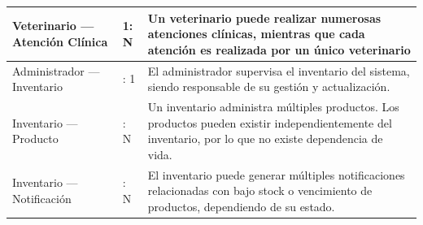 \documentclass[
]{article}
\newcounter{none} %
\begin{document}
{\def\LTcaptype{none} %
\begin{longtable}[]{@{}
  >{\raggedright\arraybackslash}p{}
  >{\raggedright\arraybackslash}p{}
  >{\raggedright\arraybackslash}p{}@{}}
\toprule\noalign{}
\begin{minipage}[b]{\linewidth}\raggedright
Veterinario --- Atención Clínica
\end{minipage} & \begin{minipage}[b]{\linewidth}\raggedright
1: N
\end{minipage} & \begin{minipage}[b]{\linewidth}\raggedright
Un veterinario puede realizar numerosas atenciones clínicas, mientras
que cada atención es realizada por un único veterinario
\end{minipage} \\
\midrule\noalign{}
\endhead
\bottomrule\noalign{}
\endlastfoot
Administrador --- Inventario & 1: 1 & El administrador supervisa el
inventario del sistema, siendo responsable de su gestión y actualización. \\
Inventario --- Producto & 1: N & Un inventario administra múltiples
productos. Los productos pueden existir independientemente del
inventario, por lo que no existe dependencia de vida. \\
Inventario --- Notificación & 1: N & El inventario puede generar
múltiples notificaciones relacionadas con bajo stock o vencimiento de productos, dependiendo de su estado. \\
\end{longtable}
}
\end{document}
